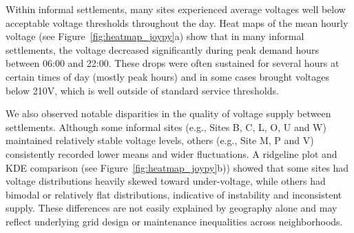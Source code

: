 \documentclass[review]{elsarticle}
\begin{document}
Within informal settlements, many sites experienced average voltages well below acceptable voltage thresholds throughout the day. Heat maps of the mean hourly voltage (see Figure~\ref{fig:heatmap_joypy}a) show that in many informal settlements, the voltage decreased significantly during peak demand hours between 06:00 and 22:00. These drops were often sustained for several hours at certain times of day (mostly peak hours) and in some cases brought voltages below 210V, which is well outside of standard service thresholds. 

We also observed notable disparities in the quality of voltage supply between settlements. Although some informal sites (e.g., Sites B, C, L, O, U and W) maintained relatively stable voltage levels, others (e.g., Site M, P and V) consistently recorded lower means and wider fluctuations. A ridgeline plot and KDE comparison (see Figure~\ref{fig:heatmap_joypy}b)) showed that some sites had voltage distributions heavily skewed toward under-voltage, while others had bimodal or relatively flat distributions, indicative of instability and inconsistent supply. These differences are not easily explained by geography alone and may reflect underlying grid design or maintenance inequalities across neighborhoods.
\end{document}
